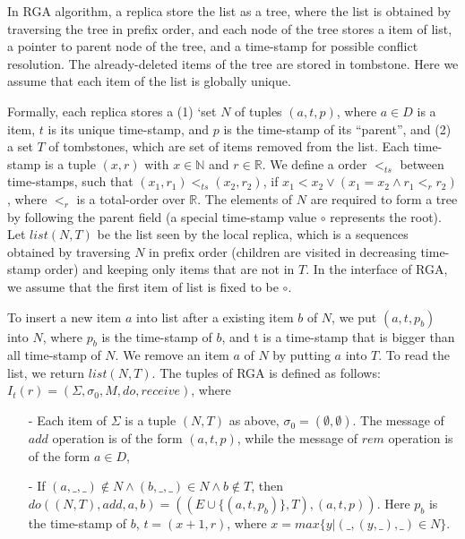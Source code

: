 \begin{example}[RGA]
\label{definition:rga implementation}
In RGA algorithm, a replica store the list as a tree, where the list is obtained by traversing the tree in prefix order, and each node of the tree stores a item of list, a pointer to parent node of the tree, and a time-stamp for possible conflict resolution. The already-deleted items of the tree are stored in tombstone. Here we assume that each item of the list is globally unique.

Formally, each replica stores a (1) `set $N$ of tuples $(a,t,p)$, where $a \in D$ is a item, $t$ is its unique time-stamp, and $p$ is the time-stamp of its ``parent'', and (2) a set $T$ of tombstones, which are set of items removed from the list. Each time-stamp is a tuple $(x,r)$ with $x \in \mathbb{N}$ and $r \in \mathbb{R}$. We define a order $<_{\mathit{ts}}$ between time-stamps, such that $(x_1,r_1) <_{\mathit{ts}} (x_2,r_2)$, if $x_1 < x_2 \vee (x_1 = x_2 \wedge r_1 <_r r_2)$, where $<_r$ is a total-order over $\mathbb{R}$. The elements of $N$ are required to form a tree by following the parent field (a special time-stamp value $\circ$ represents the root). Let $\mathit{list}(N,T)$ be the list seen by the local replica, which is a sequences obtained by traversing $N$ in prefix order (children are visited in decreasing time-stamp order) and keeping only items that are not in $T$. In the interface of RGA, we assume that the first item of list is fixed to be $\circ$.

To insert a new item $a$ into list after a existing item $b$ of $N$, we put $(a,t,p_b)$ into $N$, where $p_b$ is the time-stamp of $b$, and t is a time-stamp that is bigger than all time-stamp of $N$. We remove an item $a$ of $N$ by putting $a$ into $T$. To read the list, we return $\mathit{list}(N,T)$. The tuples of RGA is defined as follows: $I_t(r) = (\Sigma, \sigma_0, M, \mathit{do},\mathit{receive})$, where

\begin{itemize}
\setlength{\itemsep}{0.5pt}
\item[-] Each item of $\Sigma$ is a tuple $(N,T)$ as above, $\sigma_0 = (\emptyset, \emptyset)$. The message of $\mathit{add}$ operation is of the form $(a,t,p)$, while the message of $\mathit{rem}$ operation is of the form $a \in D$,

\item[-] If $(a,\_,\_) \notin N \wedge (b,\_,\_) \in N \wedge b \notin T$, then $\mathit{do}((N,T),\mathit{add},a,b) = ((E \cup \{ (a,t,p_b) \},T),(a,t,p))$. Here $p_b$ is the time-stamp of $b$, $t = (x+1,r)$, where $x = \mathit{max}\{ y \vert (\_,(y,\_),\_) \in N \}$.


\end{itemize}
\end{example}
